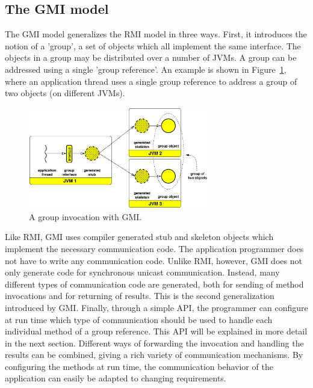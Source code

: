 \documentclass[10pt]{article}
\newcommand{\mysubsection}[1]{\subsection{#1}\label{#1}}
\begin{document}
\mysubsection{The GMI model}

The GMI model generalizes the RMI model in three ways. First, it
introduces the notion of a 'group', a set of objects which all
implement the same interface. The objects in a group may be
distributed over a number of JVMs. A group can be addressed using a
single 'group reference'. An example is shown in Figure~\ref{gmi-fig}, where an
application thread uses a single group reference to address a group of
two objects (on different JVMs).

\begin{figure}[t]
\begin{center}
\includegraphics[width=0.7\textwidth]{gmi-abstract.eps}
\end{center}
\caption{A group invocation with GMI.}
\label{gmi-fig}
\end{figure}

Like RMI, GMI uses compiler generated stub and skeleton objects which
implement the necessary communication code. The application programmer
does not have to write any communication code. Unlike RMI, however,
GMI does not only generate code for synchronous unicast
communication. Instead, many different types of communication code are
generated, both for sending of method invocations and for returning of
results. This is the second generalization introduced by GMI.
Finally, through a simple API, the programmer can configure at run
time which type of communication should be used to handle each
individual method of a group reference. This API will be explained in
more detail in the next section. Different ways of forwarding the
invocation and handling the results can be combined, giving a rich
variety of communication mechanisms. By configuring the methods at run
time, the communication behavior of the application can easily be
adapted to changing requirements.
\end{document}
